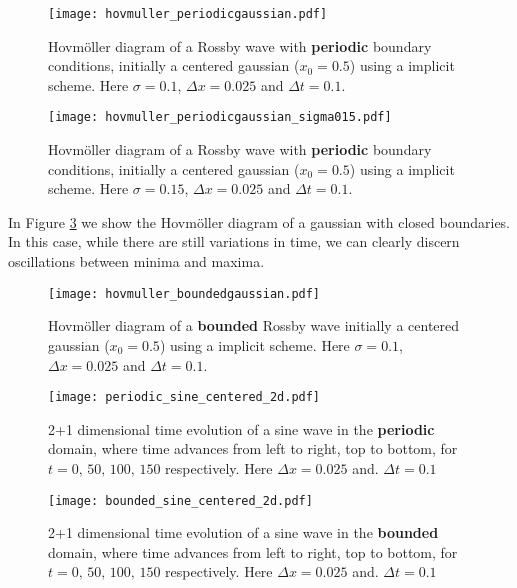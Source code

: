 \begin{figure}[htbp]
	\centering
	\texttt{[image: hovmuller\_periodicgaussian.pdf]}
	\caption{Hovmöller diagram of a Rossby wave with \textbf{periodic} boundary conditions, initially a centered gaussian ($x_0=0.5$) using a implicit scheme. Here $\sigma = 0.1$, $\Delta x = 0.025$ and $\Delta t = 0.1$.}
	\label{fig:hovmollerGaussianPeriodic}
\end{figure}

\begin{figure}[htbp]
	\centering
	\texttt{[image: hovmuller\_periodicgaussian\_sigma015.pdf]}
	\caption{Hovmöller diagram of a Rossby wave with \textbf{periodic} boundary conditions, initially a centered gaussian ($x_0=0.5$) using a implicit scheme. Here $\sigma = 0.15$, $\Delta x = 0.025$ and $\Delta t = 0.1$.}
	\label{fig:hovmollerGaussianPeriodic015}
\end{figure}

In Figure \ref{fig:hovmollerGaussianBounded} we show the Hovmöller diagram of a gaussian with closed boundaries. In this case, while there are still variations in time, we can clearly discern oscillations between minima and maxima. 
\begin{figure}[htbp]
	\centering
	\texttt{[image: hovmuller\_boundedgaussian.pdf]}
	\caption{Hovmöller diagram of a \textbf{bounded} Rossby wave initially a centered gaussian ($x_0=0.5$) using a implicit scheme. Here $\sigma = 0.1$, $\Delta x = 0.025$ and $\Delta t = 0.1$.}
	\label{fig:hovmollerGaussianBounded}
\end{figure}

\begin{figure}[htbp]
	\centering
	\texttt{[image: periodic\_sine\_centered\_2d.pdf]}
	\caption{2+1 dimensional time evolution of a sine wave in the \textbf{periodic} domain, where time advances from left to right, top to bottom, for $t = 0,\, 50,\, 100,\, 150$ respectively. Here $\Delta x = 0.025$ and. $\Delta t = 0.1$}
	\label{fig:periodicsine2d}
\end{figure}

\begin{figure}[htbp]
	\centering
	\texttt{[image: bounded\_sine\_centered\_2d.pdf]}
	\caption{2+1 dimensional time evolution of a sine wave in the \textbf{bounded} domain, where time advances from left to right, top to bottom, for $t = 0,\, 50,\, 100,\, 150$ respectively. Here $\Delta x = 0.025$ and. $\Delta t = 0.1$}
	\label{fig:boundedsine2d}
\end{figure}


